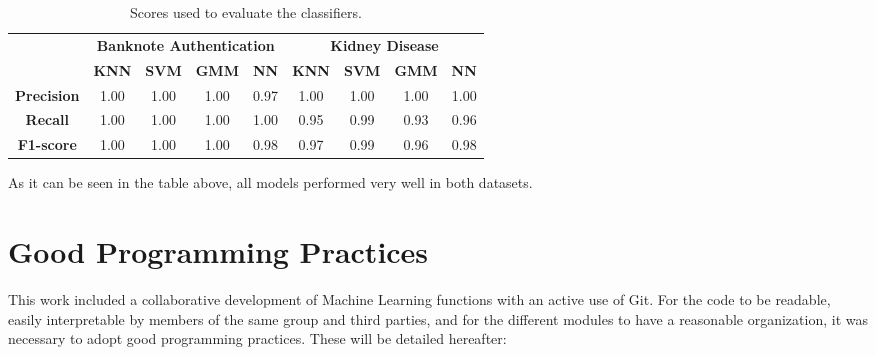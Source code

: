 \documentclass[11pt,a4paper]{article}
\begin{document}
\begin{table}[h!]
\centering
\begin{tabular}{|c|cccc|cccc|}
\hline
\multirow{2}{*}{}  & \multicolumn{4}{c|}{\textbf{Banknote Authentication}}                                                                    & \multicolumn{4}{c|}{\textbf{Kidney Disease}}                                                                            \\ \cline{2-9} 
                   & \multicolumn{1}{c|}{\textbf{KNN}}  & \multicolumn{1}{c|}{\textbf{SVM}} & \multicolumn{1}{c|}{\textbf{GMM}} & \textbf{NN} & \multicolumn{1}{c|}{\textbf{KNN}} & \multicolumn{1}{c|}{\textbf{SVM}} & \multicolumn{1}{c|}{\textbf{GMM}} & \textbf{NN} \\ \hline
\textbf{Precision} & \multicolumn{1}{c|}{1.00}          & \multicolumn{1}{c|}{1.00}         & \multicolumn{1}{c|}{1.00}         & 0.97        & \multicolumn{1}{c|}{1.00}         & \multicolumn{1}{c|}{1.00}         & \multicolumn{1}{c|}{1.00}         & 1.00        \\ \hline
\textbf{Recall}    & \multicolumn{1}{c|}{1.00}          & \multicolumn{1}{c|}{1.00}         & \multicolumn{1}{c|}{1.00}         & 1.00        & \multicolumn{1}{c|}{0.95}         & \multicolumn{1}{c|}{0.99}         & \multicolumn{1}{c|}{0.93}         & 0.96        \\ \hline
\textbf{F1-score}  & \multicolumn{1}{c|}{1.00} & \multicolumn{1}{c|}{1.00}         & \multicolumn{1}{c|}{1.00}         & 0.98        & \multicolumn{1}{c|}{0.97}         & \multicolumn{1}{c|}{0.99}         & \multicolumn{1}{c|}{0.96}         & 0.98        \\ \hline
\end{tabular}
\caption{Scores used to evaluate the classifiers.}
\label{tab:scores}
\end{table}

As it can be seen in the table above, all models performed very well in both datasets.

\section{Good Programming Practices}

This work included a collaborative development of Machine Learning functions with an active use of Git. For the code to be readable, easily interpretable by members of the same group and third parties, and for the different modules to have a reasonable organization, it was necessary to adopt good programming practices. These will be detailed hereafter:
\end{document}
